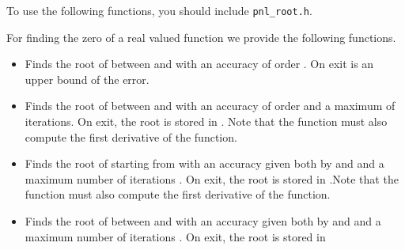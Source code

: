 To use the following functions, you should include \verb!pnl_root.h!.

For finding the zero of a real valued function we provide the following
functions.
\begin{itemize}
\item {}
  \sshortdescribe Finds the root of  between  and  with
  an accuracy of order . On exit  is an upper bound of the
  error.

\item {}
  \sshortdescribe Finds the root of  between  and  with
  an accuracy of order  and a maximum of  iterations. On
  exit, the root is stored in . Note that the function  must
  also compute the first derivative of the function.


\item {}
  \sshortdescribe Finds the root of  starting from  with an
  accuracy given both by  and  and a maximum number of
  iterations . On exit, the root is stored in .Note that
  the function  must also compute the first derivative of the function.

\item {}
  \sshortdescribe Finds the root of  between  and  with
  an accuracy given both by  and  and a maximum number
  of iterations . On exit, the root is stored in 
\end{itemize}


